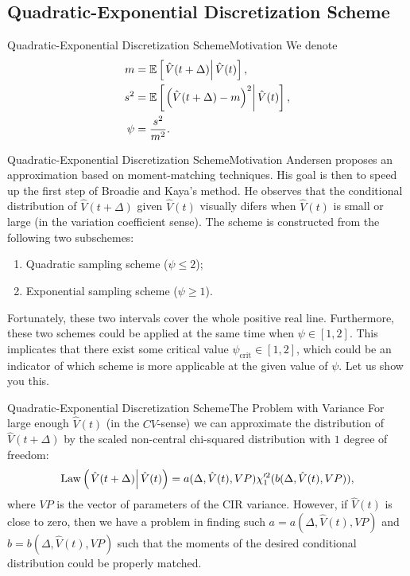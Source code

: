 \subsection{Quadratic-Exponential Discretization Scheme}
    \begin{frame}{Quadratic-Exponential Discretization Scheme}{Motivation}
        We denote 
        \begin{align}
            m    &= \mathbb{E}\left[\left.\hat{V}(t+\Delta)\right| \hat{V}(t)\right], \\
            s^2  &= \mathbb{E}\left[\left.\left(\hat{V}(t+\Delta) - m\right)^2\right| \hat{V}(t)\right], \\
            \psi &= \frac{s^2}{m^2}.
        \end{align}
    \end{frame}

    \begin{frame}{Quadratic-Exponential Discretization Scheme}{Motivation}
        Andersen proposes an approximation based on moment-matching techniques. His goal is then to speed up the first step of Broadie and Kaya's method.
        He observes that the conditional distribution of $\hat{V}(t+\Delta)$ given $\hat{V}(t)$ visually difers when $\hat{V}(t)$ is small or large (in the variation coefficient sense).
        The scheme is constructed from the following two subschemes:
        \begin{enumerate}
            \item Quadratic sampling scheme ($\psi \leq 2$);
            \item Exponential sampling scheme ($\psi \geq 1$).
        \end{enumerate}
        Fortunately, these two intervals cover the whole positive real line. Furthermore, these two schemes could be applied at the same time when $\psi\in[1, 2]$. This implicates that there exist some critical value $\psi_{\text{crit}}\in[1, 2]$, which could be an indicator of which scheme is more applicable at the given value of $\psi$. Let us show you this.
    \end{frame}

    \begin{frame}{Quadratic-Exponential Discretization Scheme}{The Problem with Variance}
        For large enough $\hat{V}(t)$ (in the $CV$-sense) we can approximate the distribution of $\hat{V}(t+\Delta)$ by the scaled non-central chi-squared distribution with $1$ degree of freedom:
        \begin{align}
            \operatorname*{Law}\left(\left.\hat{V}(t+\Delta) \right| \hat V(t)\right) =  a(\Delta, \hat{V}(t), VP) \chi'^2_1(b(\Delta, \hat{V}(t), VP)),
        \end{align}
        where $VP$ is the vector of parameters of the CIR variance.
        However, if $\hat{V}(t)$ is close to zero, then we have a problem in finding such $a = a(\Delta, \hat{V}(t), VP)$ and $b = b(\Delta, \hat{V}(t), VP)$ such that the moments of the desired conditional distribution could be properly matched.
    \end{frame}

